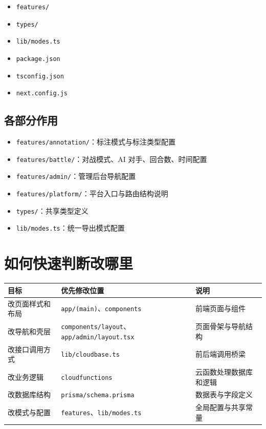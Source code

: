 \documentclass[11pt,a4paper]{ctexart}
\begin{document}
\begin{itemize}
  \item \texttt{features/}
  \item \texttt{types/}
  \item \texttt{lib/modes.ts}
  \item \texttt{package.json}
  \item \texttt{tsconfig.json}
  \item \texttt{next.config.js}
\end{itemize}

\subsection{各部分作用}

\begin{itemize}
  \item \texttt{features/annotation/}：标注模式与标注类型配置
  \item \texttt{features/battle/}：对战模式、AI 对手、回合数、时间配置
  \item \texttt{features/admin/}：管理后台导航配置
  \item \texttt{features/platform/}：平台入口与路由结构说明
  \item \texttt{types/}：共享类型定义
  \item \texttt{lib/modes.ts}：统一导出模式配置
\end{itemize}

\section{如何快速判断改哪里}

\begin{longtable}{|>{\raggedright\arraybackslash}p{}|>{\raggedright\arraybackslash}p{}|>{\raggedright\arraybackslash}p{}|}
\hline
\textbf{目标} & \textbf{优先修改位置} & \textbf{说明} \\
\hline
改页面样式和布局 & \texttt{app/(main)}、\texttt{components} & 前端页面与组件 \\
\hline
改导航和壳层 & \texttt{components/layout}、\texttt{app/admin/layout.tsx} & 页面骨架与导航结构 \\
\hline
改接口调用方式 & \texttt{lib/cloudbase.ts} & 前后端调用桥梁 \\
\hline
改业务逻辑 & \texttt{cloudfunctions} & 云函数处理数据库和逻辑 \\
\hline
改数据库结构 & \texttt{prisma/schema.prisma} & 数据表与字段定义 \\
\hline
改模式与配置 & \texttt{features}、\texttt{lib/modes.ts} & 全局配置与共享常量 \\
\hline
\end{longtable}
\end{document}
